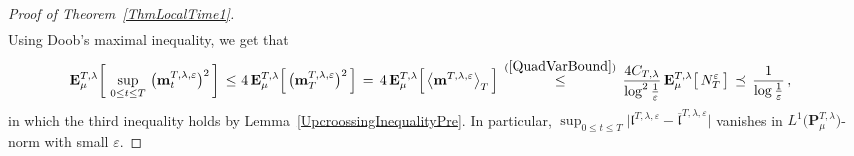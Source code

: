 \documentclass[10pt]{article}
\def\stackrel#1#2{\mathrel{\mathop{#2}\limits^{#1}}}
\numberwithin{equation}{section}
\theoremstyle{definition}
\begin{document}
\begin{proof}[Proof of Theorem~\ref{ThmLocalTime1}]
\begin{align}
\end{align}
Using Doob's maximal inequality, we get that
\begin{align*}
\mathbf{E}_{\mu}^{T,\lambda}\bigg[\,\sup_{0\leq t\leq T}\,\big(\mathbf{m}_{t}^{T,\lambda,\varepsilon}\big)^2\,\bigg]\,\leq \,&\,
4\,\mathbf{E}_{\mu}^{T,\lambda}\Big[\,\big(\mathbf{m}_{T}^{T,\lambda,\varepsilon}\big)^2\,\Big]\,=\,4\,\mathbf{E}_{\mu}^{T,\lambda}\Big[ \,\big\langle \mathbf{m}^{T,\lambda,\varepsilon}\big\rangle_T \,\Big] \,\stackrel{(\ref{QuadVarBound})}{\leq} \,\frac{ 4 C_{T,\lambda} }{ \log^2\frac{1}{\varepsilon}  }\, \mathbf{E}_{\mu}^{T,\lambda}\big[ \,N_{T }^{\varepsilon}\,\big] 
\,\preceq \,\frac{1}{ \log \frac{1}{\varepsilon}  } \,,
\end{align*}
in which  the 
third inequality holds  by Lemma~\ref{UpcroossingInequalityPre}.  In particular, $\sup_{0\leq t\leq T}\big|\mathfrak{l}^{T,\lambda,\varepsilon}-\overline{\mathfrak{l}}^{T,\lambda,\varepsilon}\big|$
vanishes in $L^1\big(\mathbf{P}_{\mu}^{T,\lambda}\big)$-norm with small $\varepsilon$.



\end{proof}
\end{document}

